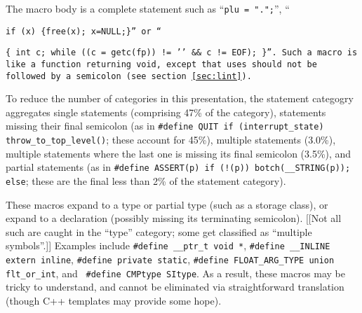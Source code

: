 \begin{description}
\item[Statement]  The macro body is a complete statement such as
  ``{\tt plu = ".";}'', ``{\tt if (x) \verb|{|free(x); x=NULL;\verb|}|'' or
    ``{\tt \verb|{| int c; while ((c = getc(fp)) != '\n' && c != EOF);
    \verb|}|''.  Such a macro is like a function 
    returning {\tt void}, except that uses should not be followed by a
    semicolon (see section~\ref{sec:lint}).
    
    To reduce the number of categories in this presentation, the statement
    categogry aggregates single statements (comprising 47\% of the category),
    statements missing their final semicolon (as in {\tt \#define QUIT if
    (\verb|interrupt_state|) \verb|throw_to_top_level|()}; these account
  for 45\%), multiple statements (3.0\%), multiple statements where the
  last one is missing its final semicolon (3.5\%), and partial statements
  (as in {\tt \#define ASSERT(p) if (!(p)) botch(\verb|__STRING|(p));
  else}; these are the final less than 2\% of the statement category).

\item[Type] 
  These macros expand to a type or partial type (such as a storage class),
  or expand to a declaration (possibly missing its terminating semicolon).
  [[Not all such are caught in the ``type'' category; some get classified
  as ``multiple symbols''.]]  Examples include {\tt \#define \verb|__ptr_t|
  void *}, {\tt \#define \verb|__INLINE| extern inline}, {\tt \#define
private static}, {\tt \#define \verb|FLOAT_ARG_TYPE| union \verb|flt_or_int|}, and {\tt
\#define CMPtype SItype}.  As a result, these macros may be tricky to
understand, and cannot be eliminated via straightforward translation
(though C++ templates may provide some hope).



}}
\end{description}
